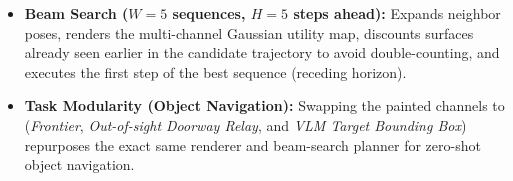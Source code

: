 \documentclass[11pt,a4paper]{article}
\theoremstyle{definition}
\theoremstyle{plain}
\theoremstyle{remark}
\begin{document}
\begin{itemize}
\begin{itemize}
        \item \textbf{Beam Search ($W=5$ sequences, $H=5$ steps ahead):} Expands neighbor poses, renders the multi-channel Gaussian utility map, discounts surfaces already seen earlier in the candidate trajectory to avoid double-counting, and executes the first step of the best sequence (receding horizon).
        \item \textbf{Task Modularity (Object Navigation):} Swapping the painted channels to (\emph{Frontier}, \emph{Out-of-sight Doorway Relay}, and \emph{VLM Target Bounding Box}) repurposes the exact same renderer and beam-search planner for zero-shot object navigation.
    \end{itemize}
\end{itemize}
\end{document}
